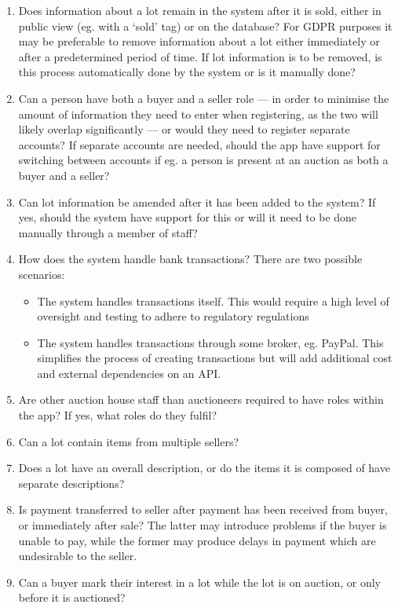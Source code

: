 \documentclass[titlepage, 12pt]{extarticle}
\begin{document}
\begin{enumerate}
\item Does information about a lot remain in the system after it is sold, either in public view (eg. with a `sold' tag) or on the database? For GDPR purposes it may be preferable to remove information about a lot either immediately or after a predetermined period of time. If lot information is to be removed, is this process automatically done by the system or is it manually done?
\item Can a person have both a buyer and a seller role --- in order to minimise the amount of information they need to enter when registering, as the two will likely overlap significantly --- or would they need to register separate accounts? If separate accounts are needed, should the app have support for switching between accounts if eg. a person is present at an auction as both a buyer and a seller?
\item Can lot information be amended after it has been added to the system? If yes, should the system have support for this or will it need to be done manually through a member of staff?
\item How does the system handle bank transactions? There are two possible scenarios:
  \begin{itemize}
  \item The system handles transactions itself. This would require a high level of oversight and testing to adhere to regulatory regulations
  \item The system handles transactions through some broker, eg. PayPal. This simplifies the process of creating transactions but will add additional cost and external dependencies on an API. 
  \end{itemize}
\item Are other auction house staff than auctioneers required to have roles within the app? If yes, what roles do they fulfil?
\item Can a lot contain items from multiple sellers? 
\item Does a lot have an overall description, or do the items it is composed of have separate descriptions?
\item Is payment transferred to seller after payment has been received from buyer, or immediately after sale? The latter may introduce problems if the buyer is unable to pay, while the former may produce delays in payment which are undesirable to the seller.
\item Can a buyer mark their interest in a lot while the lot is on auction, or only before it is auctioned?
\end{enumerate}
\end{document}

